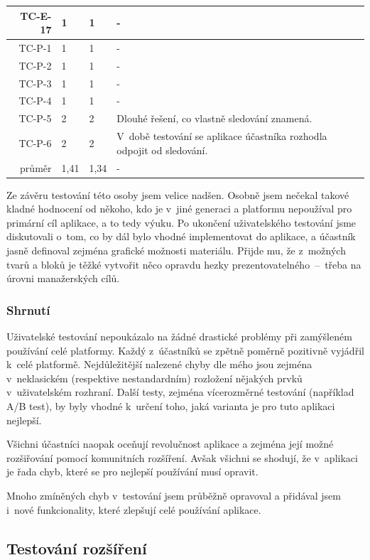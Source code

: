 \begin{longtable}{r|p{2cm}|p{2cm}|p{6cm}}
TC-E-17  & 1 & 1 & - \\\hline
TC-P-1   & 1 & 1 & - \\\hline
TC-P-2   & 1 & 1 & - \\\hline
TC-P-3   & 1 & 1 & - \\\hline
TC-P-4   & 1 & 1 & - \\\hline
TC-P-5   & 2 & 2 & Dlouhé řešení, co vlastně sledování znamená. \\\hline
TC-P-6   & 2 & 2 & V~době testování se aplikace účastníka rozhodla odpojit od sledování. \\\hline\hline
průměr   & 1,41 & 1,34 & - \\
\end{longtable}

Ze závěru testování této osoby jsem velice nadšen.
Osobně jsem nečekal takové kladné hodnocení od někoho, kdo je v~jiné generaci a platformu nepoužíval pro primární cíl aplikace, a to tedy výuku.
Po ukončení uživatelského testování jsme diskutovali o~tom, co by dál bylo vhodné implementovat do aplikace, a účastník jasně definoval zejména grafické možnosti materiálu.
Přijde mu, že z~možných tvarů a bloků je těžké vytvořit něco opravdu hezky prezentovatelného~--~třeba na úrovni manažerských cílů.

\subsubsection{Shrnutí}

Uživatelské testování nepoukázalo na žádné drastické problémy při zamýšleném používání celé platformy.
Každý z~účastníků se zpětně poměrně pozitivně vyjádřil k~celé platformě.
Nejdůležitější nalezené chyby dle mého jsou zejména v~neklasickém (respektive nestandardním) rozložení nějakých prvků v~uživatelském rozhraní.
Další testy, zejména vícerozměrné testování (například A/B test), by byly vhodné k~určení toho, jaká varianta je pro tuto aplikaci nejlepší.

Všichni účastníci naopak oceňují revolučnost aplikace a zejména její možné rozšiřování pomocí komunitních rozšíření.
Avšak všichni se shodují, že v~aplikaci je řada chyb, které se pro nejlepší používání musí opravit.

Mnoho zmíněných chyb v~testování jsem průběžně opravoval a přidával jsem i~nové funkcionality, které zlepšují celé používání aplikace. 

\subsection{Testování rozšíření}\label{text:testovani/rozsireni}

